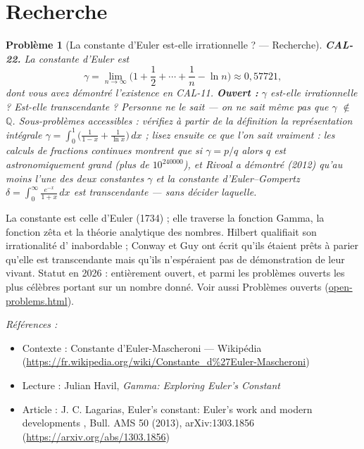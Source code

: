 \documentclass[11pt]{article}
\newtheorem{problem}{Problème}
\newenvironment{refs}{\par\small\noindent\emph{Références :}\begin{itemize}\setlength\itemsep{0pt}}{\end{itemize}\normalsize}
\begin{document}
\bigskip


\section*{Recherche}

\begin{problem}[{La constante d'Euler est-elle irrationnelle ? --- Recherche}]
\textbf{CAL-22.} La constante d'Euler est
\[ \gamma = \lim_{n\to\infty}\Big( 1 + \frac12 + \cdots + \frac1n - \ln n \Big)
\approx 0{,}57721, \]
dont vous avez démontré l'existence en CAL-11. \textbf{Ouvert :} $\gamma$ est-elle irrationnelle ? Est-elle transcendante ?
Personne ne le sait --- on ne sait même pas que $\gamma$ $\notin$ $\mathbb{Q}$. Sous-problèmes accessibles : vérifiez à partir de la
définition la représentation intégrale
$ \gamma = \int_0^1 \big( \frac{1}{1-x} + \frac{1}{\ln x} \big)\,dx $ ; lisez ensuite ce que l'on
sait \textit{vraiment} : les calculs de fractions continues montrent que si $ \gamma = p/q $ alors
$ q $ est astronomiquement grand (plus de $ 10^{240000} $), et Rivoal a démontré (2012)
qu'au moins l'une des deux constantes $\gamma$ et la constante d'Euler--Gompertz
$ \delta = \int_0^\infty \frac{e^{-x}}{1+x}\,dx $ est transcendante --- sans décider
laquelle.
\end{problem}

\noindent La constante est celle d'Euler (1734) ; elle traverse la fonction Gamma,
la fonction zêta et la théorie analytique des nombres. Hilbert qualifiait son irrationalité
d'\og{} inabordable \fg{} ; Conway et Guy ont écrit qu'ils étaient prêts à parier qu'elle est
transcendante mais qu'ils n'espéraient pas de démonstration de leur vivant. Statut en 2026 : entièrement
ouvert, et parmi les problèmes ouverts les plus célèbres portant sur un nombre donné. Voir aussi
Problèmes ouverts (\url{open-problems.html}).

\begin{refs}
\item Contexte : Constante d'Euler-Mascheroni --- Wikipédia (\url{https://fr.wikipedia.org/wiki/Constante_d%27Euler-Mascheroni})
\item Lecture : Julian Havil, \textit{Gamma: Exploring Euler's Constant}
\item Article : J. C. Lagarias, \og{} Euler's constant: Euler's work and modern developments \fg{}, Bull. AMS 50 (2013), arXiv:1303.1856 (\url{https://arxiv.org/abs/1303.1856})
\end{refs}

\bigskip
\end{document}
